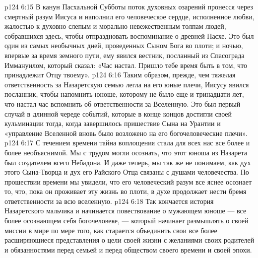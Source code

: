 \vs p124 6:15 \pc В канун Пасхальной Субботы поток духовных озарений пронесся через смертный разум Иисуса и наполнил его человеческое сердце, исполненное любви, жалостью к духовно слепым и морально невежественным толпам людей, собравшихся здесь, чтобы отпраздновать воспоминание о древней Пасхе. Это был один из самых необычных дней, проведенных Сыном Бога во плоти; и ночью, впервые за время земного пути, ему явился вестник, посланный из Спасограда Иммануилом, который сказал: «Час настал. Пришло тебе время быть в том, что принадлежит Отцу твоему».
\vs p124 6:16 Таким образом, прежде, чем тяжелая ответственность за Назаретскую семью легла на его юные плечи, Иисусу явился посланник, чтобы напомнить юноше, которому не было еще и тринадцати лет, что настал час вспомнить об ответственности за Вселенную. Это был первый случай в длинной череде событий, которые в конце концов достигли своей кульминации тогда, когда завершилось пришествие Сына на Урантии и «управление Вселенной вновь было возложено на его богочеловеческие плечи».
\vs p124 6:17 С течением времени тайна воплощения стала для всех нас все более и более необъяснимой. Мы с трудом могли осознать, что этот юноша из Назарета был создателем всего Небадона. И даже теперь, мы так же не понимаем, как дух этого Сына\hyp{}Творца и дух его Райского Отца связаны с душами человечества. По прошествии времени мы увидели, что его человеческий разум все яснее осознает то, что, пока он проживает эту жизнь во плоти, в духе продолжает нести бремя ответственности за всю вселенную.
\vs p124 6:18 \pc Так кончается история Назаретского мальчика и начинается повествование о мужающем юноше --- все более осознающем себя богочеловеке, --- который начинает размышлять о своей миссии в мире по мере того, как старается объединить свои все более расширяющиеся представления о цели своей жизни с желаниями своих родителей и обязанностями перед семьей и перед обществом своего времени и своей эпохи.
